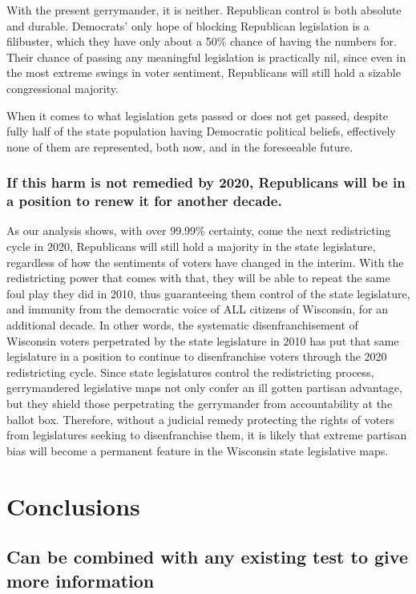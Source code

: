 \documentclass[preprint,12pt]{article}
\begin{document}
With the present gerrymander, it is neither.  Republican control is both absolute and durable.  Democrats' only hope of blocking Republican legislation is a filibuster, which they have only about a 50\% chance of having the numbers for.  Their chance of passing any meaningful legislation is practically nil, since even in the most extreme swings in voter sentiment, Republicans will still hold a sizable congressional majority.
 
When it comes to what legislation gets passed or does not get passed, despite fully half of the state population having Democratic political beliefs, effectively none of them are represented, both now, and in the foreseeable future.  
 
\subsubsection{If this harm is not remedied by 2020, Republicans will be in a position to renew it for another decade.}
 
As our analysis shows, with over 99.99\% certainty, come the next redistricting cycle in 2020, Republicans will still hold a majority in the state legislature, regardless of how the sentiments of voters have changed in the interim.  With the redistricting power that comes with that, they will be able to repeat the same foul play they did in 2010, thus guaranteeing them control of the state legislature, and immunity from the democratic voice of ALL citizens of Wisconsin, for an additional decade. In other words, the systematic disenfranchisement of Wisconsin voters perpetrated by the state legislature in 2010 has put that same legislature in a position to continue to disenfranchise voters through the 2020 redistricting cycle. Since state legislatures control the redistricting process, gerrymandered legislative maps not only confer an ill gotten partisan advantage, but they shield those perpetrating the gerrymander from accountability at the ballot box. Therefore, without a judicial remedy protecting the rights of voters from legislatures seeking to disenfranchise them, it is likely that extreme partisan bias will become a permanent feature in the Wisconsin state legislative maps.



\section{Conclusions}

\subsection{Can be combined with any existing test to give more information}
 
\end{document}
